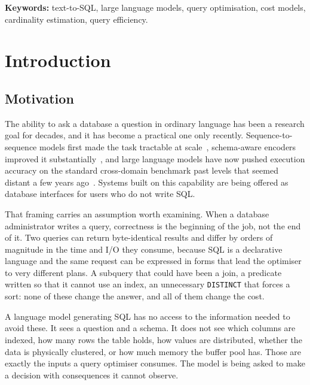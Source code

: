 \documentclass[12pt, a4paper]{article}
\begin{document}
\vspace{0.5em}
\noindent
\textbf{Keywords:} text-to-SQL, large language models, query
optimisation, cost models, cardinality estimation, query efficiency.

\newpage
\tableofcontents
\newpage

\section{Introduction}
\label{sec:intro}

\subsection{Motivation}

The ability to ask a database a question in ordinary language has been a
research goal for decades, and it has become a practical one only
recently. Sequence-to-sequence models first made the task tractable at
scale~\cite{zhong2017seq2sql}, schema-aware encoders improved it
substantially~\cite{wang2020ratsql}, and large language models have now
pushed execution accuracy on the standard cross-domain benchmark past
levels that seemed distant a few years
ago~\cite{yu2018spider, pourreza2023dinsql, gao2024dailsql}. Systems
built on this capability are being offered as database interfaces for
users who do not write SQL.

That framing carries an assumption worth examining. When a database
administrator writes a query, correctness is the beginning of the job,
not the end of it. Two queries can return byte-identical results and
differ by orders of magnitude in the time and I/O they consume, because
SQL is a declarative language and the same request can be expressed in
forms that lead the optimiser to very different plans. A subquery that
could have been a join, a predicate written so that it cannot use an
index, an unnecessary \texttt{DISTINCT} that forces a sort: none of
these change the answer, and all of them change the cost.

A language model generating SQL has no access to the information needed
to avoid these. It sees a question and a schema. It does not see which
columns are indexed, how many rows the table holds, how values are
distributed, whether the data is physically clustered, or how much
memory the buffer pool has. Those are exactly the inputs a query
optimiser consumes. The model is being asked to make a decision with
consequences it cannot observe.
\end{document}
